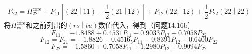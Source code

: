 \begin{examplebox}
        \begin{equation*}
            F_{22} = H^{\text{core}}_{22} + P_{11} \left[\left(22 \middle| 11\right) - \frac{1}{2} \left(21 \middle| 12\right)\right] + P_{12} \left(22 \middle| 12\right) + \frac{1}{2}P_{22} \left(22 \middle| 22\right)
        \end{equation*}
        将$H^{\text{core}}_{rs}$和之前列出的$\left(rs \middle| tu\right)$数值代入，得到（问题14.16b）
        \begin{equation}
            F_{11} = -1.8488 + 0.4531 P_{11} + 0.9033 P_{12} + 0.7058 P_{22}
            \label{eq:14.50}
        \end{equation}
        \begin{equation}
            F_{12} = F_{21} = -1.8826 + 0.4516_5 P_{11} + 0.8391 P_{12} + 0.6400 P_{22}
            \label{eq:14.51}
        \end{equation}
        \begin{equation}
            F_{22} = -1.5860 + 0.7058 P_{11} + 1.2980 P_{12} + 0.9094 P_{22}
            \label{eq:14.52}
        \end{equation}


\end{examplebox}
